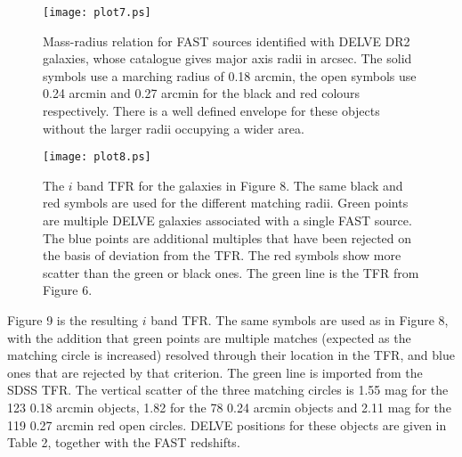 \documentclass{article}
\begin{document}
\begin{figure}	
\texttt{[image: plot7.ps]}
\caption{Mass-radius relation for FAST sources identified with DELVE DR2 galaxies, whose catalogue gives major axis radii in arcsec. The solid symbols use a marching radius of 0.18 arcmin, the open symbols use 0.24 arcmin and 0.27 arcmin for the black and red colours respectively. There is a well defined envelope for these objects without the larger radii occupying a wider area.}
\end{figure}

\begin{figure}	
\texttt{[image: plot8.ps]}
\caption{The $i$ band TFR for the galaxies in Figure 8. The same black and red symbols are used for the different matching radii. Green points are multiple DELVE galaxies associated with a single FAST source. The blue points are additional multiples that have been rejected on the basis of deviation from the TFR. The red symbols show more scatter than the green or black ones. The green line is the TFR from Figure 6.}
\end{figure}
Figure 9 is the resulting $i$ band TFR. The same symbols are used as in Figure 8, with the addition that green points are multiple matches (expected as the matching circle is increased) resolved through their location in the TFR, and blue ones that are rejected by that criterion. The green line is imported from the SDSS TFR. The vertical scatter of the three matching circles is 1.55 mag for the 123 0.18 arcmin objects, 1.82 for the 78 0.24 arcmin objects and 2.11 mag for the 119 0.27 arcmin red open circles. %
DELVE positions for these objects are given in Table 2, together with the FAST redshifts.
\end{document}
